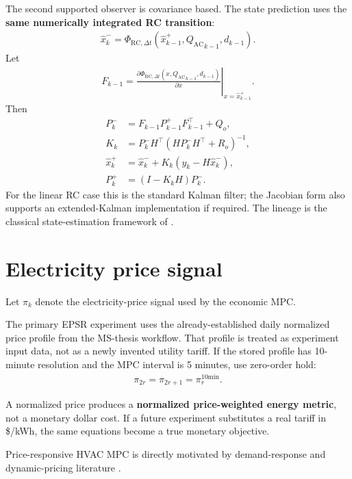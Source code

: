 \documentclass[11pt]{article}
\newcommand{\QAC}{Q_{\mathrm{AC}}}
\begin{document}
The second supported observer is covariance based.  The state prediction uses the \textbf{same
numerically integrated RC transition}:
\begin{align}
\widehat x^-_k
=
\Phi_{\mathrm{RC},\Delta t}
(
\widehat x^+_{k-1},{\QAC}_{k-1},d_{k-1}
).
\tag{6.56}
\end{align}
Let
\begin{align}
F_{k-1}
=
\left.
\frac{\partial
\Phi_{\mathrm{RC},\Delta t}(x,{\QAC}_{k-1},d_{k-1})}
{\partial x}
\right|_{x=\widehat x^+_{k-1}}.
\tag{6.57}
\end{align}
Then
\begin{align}
P^-_k
&=
F_{k-1}P^+_{k-1}F_{k-1}^\top+Q_o,
\\
K_k
&=
P^-_kH^\top
\left(
HP^-_kH^\top+R_o
\right)^{-1},
\\
\widehat x^+_k
&=
\widehat x^-_k
+
K_k
\left(
y_k-H\widehat x^-_k
\right),
\\
P^+_k
&=
(I-K_kH)P^-_k.
\tag{6.58}
\end{align}
For the linear RC case this is the standard Kalman filter; the Jacobian form also supports an
extended-Kalman implementation if required.  The lineage is the classical state-estimation
framework of \citet{kalman1960filter}.

\section{Electricity price signal}

Let \(\pi_k\) denote the electricity-price signal used by the economic MPC.

The primary EPSR experiment uses the already-established daily normalized price profile from the
MS-thesis workflow.  That profile is treated as experiment input data, not as a newly invented
utility tariff.  If the stored profile has 10-minute resolution and the MPC interval is 5 minutes,
use zero-order hold:
\begin{align}
\boxed{
\pi_{2r}=\pi_{2r+1}=\pi_r^{10\mathrm{min}}.
}
\tag{6.59}
\end{align}

A normalized price produces a \textbf{normalized price-weighted energy metric}, not a monetary
dollar cost.  If a future experiment substitutes a real tariff in \$/kWh, the same equations
become a true monetary objective.

Price-responsive HVAC MPC is directly motivated by demand-response and dynamic-pricing
literature \citep{avci2013price,amin2020price,zanetti2025flex}.
\end{document}
